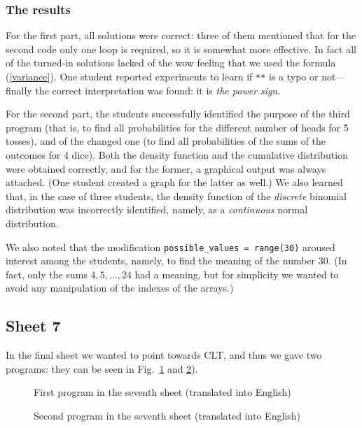 \documentclass[]{interact}
\theoremstyle{plain}%
\theoremstyle{definition}
\theoremstyle{remark}
\begin{document}
\subsubsection*{The results}

For the first part, all solutions were correct: three of them mentioned that
for the second code only one loop is required, so it is somewhat more effective.
In fact all of the turned-in solutions lacked of the wow feeling that we used
the formula (\ref{variance}). One student reported
experiments to learn if \texttt{**} is a typo or not---finally the correct interpretation
was found: it is \textit{the power sign}.

For the second part, the students successfully identified the purpose of the third program
(that is, to find all probabilities for the different number of heads for 5 tosses), and of the changed one
(to find all probabilities of the sums of the outcomes for 4 dice). Both the density
function and the cumulative distribution were obtained correctly, and for the former,
a graphical output was always attached. (One student created a graph for the latter as well.)
We also learned that, in the case of three students, the density function of the
\textit{discrete} binomial distribution
was incorrectly identified, namely, as a \textit{continuous} normal distribution.

We also noted that the modification \texttt{possible\_values = range(30)} aroused interest
among the students,
namely, to find the meaning of the number 30. (In fact, only the sums $4,5,\ldots,24$
had a meaning, but for simplicity we wanted to avoid any manipulation of the indexes of
the arrays.)

\subsection*{Sheet 7}

In the final sheet we wanted to point towards CLT, and thus we gave two programs:
they can be seen in Fig.~\ref{7a.py} and \ref{7b.py}).

\begin{figure}

\caption{First program in the seventh sheet (translated into English)}
\label{7a.py}
\end{figure}

\begin{figure}

\caption{Second program in the seventh sheet (translated into English)}
\label{7b.py}
\end{figure}
\end{document}
